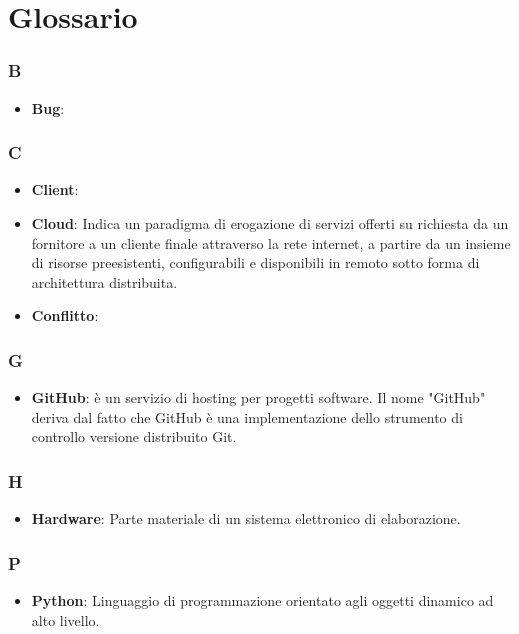 \appendix

\section{Glossario}
\subsubsection{B}
\begin{itemize}
	\item \textbf{Bug}:
\end{itemize}

\subsubsection{C}
\begin{itemize}
	\item \textbf{Client}:
	\item \textbf{Cloud}: Indica un paradigma di erogazione di servizi offerti su richiesta da un fornitore a un cliente finale attraverso la rete internet, a partire da un insieme di risorse preesistenti, configurabili e disponibili in remoto sotto forma di architettura distribuita. 
	\item \textbf{Conflitto}:
\end{itemize}
\subsubsection{G}
\begin{itemize}
	\item \textbf{GitHub}: è un servizio di hosting per progetti software. Il nome "GitHub" deriva dal fatto che
GitHub è una implementazione dello strumento di controllo versione distribuito Git.
\end{itemize}
\subsubsection{H}
\begin{itemize}
	\item \textbf{Hardware}: Parte materiale di un sistema elettronico di elaborazione.
\end{itemize}

\subsubsection{P}
\begin{itemize}
	\item \textbf{Python}: Linguaggio di programmazione orientato agli oggetti dinamico ad alto livello.
\end{itemize}

